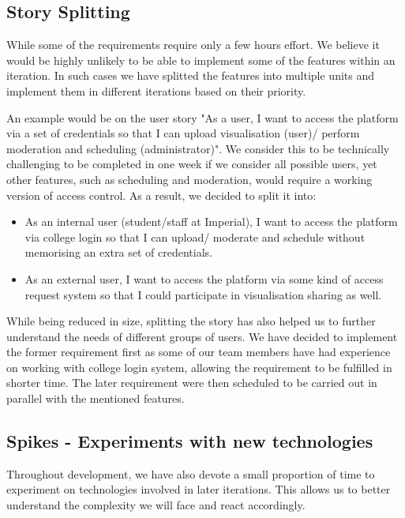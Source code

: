 \documentclass[a4paper]{article}
\begin{document}
\subsection{Story Splitting}
While some of the requirements require only a few hours effort. We believe
it would be highly unlikely to be able to implement some of the features within an
iteration. In such cases we have splitted the features into multiple units and
implement them in different iterations based on their priority.

An example would be on the user story
 "As a user, I want to access the platform via a set of
credentials so that I can upload visualisation (user)/ perform moderation and
scheduling (administrator)". We consider this to be technically challenging to
be completed in one week if we consider all possible users, yet other features,
such as scheduling and moderation, would require a working version of access
control. As a result, we decided to split it into:

\begin{itemize}
  \item As an internal user (student/staff at Imperial), I want to access the 
        platform via college login so that I can upload/ moderate and schedule
        without memorising an extra set of credentials.
  \item As an external user, I want to access the platform via some kind
        of access request system so that I could participate in visualisation
        sharing as well. 
\end{itemize}

While being reduced in size, splitting the story has also helped us to 
further understand the needs of different groups of users. 
We have decided to implement the former requirement
first as some of our team members have had experience on working with college
login system, allowing the requirement to be fulfilled in shorter time.
The later requirement were then scheduled
to be carried out in parallel with the mentioned features.

\subsection{Spikes - Experiments with new technologies}
Throughout development, we have also devote a small proportion of time to
experiment on technologies involved in later iterations. This allows us to
better understand the complexity we will face and react accordingly.
\end{document}
